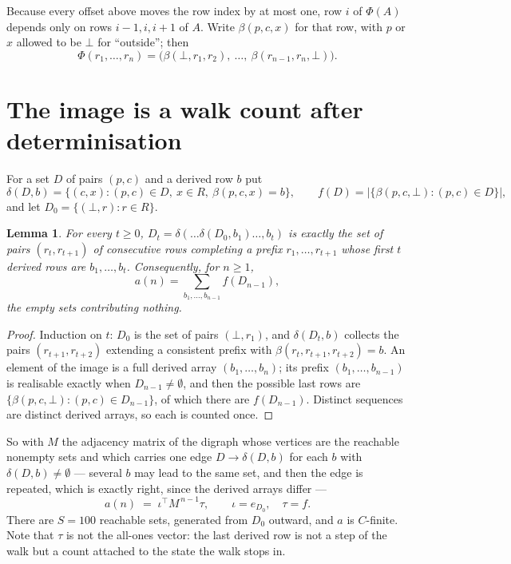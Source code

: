\documentclass[11pt,a4paper]{article}
\theoremstyle{plain}
\newtheorem{lemma}[theorem]{Lemma}
\theoremstyle{definition}
\begin{document}
Because every offset above moves the row index by at most one, row $i$ of
$\Phi(A)$ depends only on rows $i-1,i,i+1$ of $A$. Write $\beta(p,c,x)$ for that row, with $p$
or $x$ allowed to be $\bot$ for ``outside''; then
\[
\Phi(r_1,\dots,r_n)=\bigl(\beta(\bot,r_1,r_2),\ \dots,\ \beta(r_{n-1},r_n,\bot)\bigr).
\]

\section{The image is a walk count after determinisation}

For a set $D$ of pairs $(p,c)$ and a derived row $b$ put
\[
\delta(D,b)=\{(c,x):(p,c)\in D,\ x\in R,\ \beta(p,c,x)=b\},\qquad
f(D)=\bigl|\{\beta(p,c,\bot):(p,c)\in D\}\bigr| ,
\]
and let $D_0=\{(\bot,r):r\in R\}$.

\begin{lemma}\label{lem:det}
For every $t\ge0$, $D_t=\delta(\dots\delta(D_0,b_1)\dots,b_t)$ is exactly the set of pairs
$(r_t,r_{t+1})$ of consecutive rows completing a prefix $r_1,\dots,r_{t+1}$ whose first $t$
derived rows are $b_1,\dots,b_t$. Consequently, for $n\ge1$,
\[
a(n)=\sum_{b_1,\dots,b_{n-1}}f(D_{n-1}),
\]
the empty sets contributing nothing.
\end{lemma}

\begin{proof}
Induction on $t$: $D_0$ is the set of pairs $(\bot,r_1)$, and $\delta(D_t,b)$ collects the
pairs $(r_{t+1},r_{t+2})$ extending a consistent prefix with
$\beta(r_t,r_{t+1},r_{t+2})=b$. An element of the image is a full derived array
$(b_1,\dots,b_n)$; its prefix $(b_1,\dots,b_{n-1})$ is realisable exactly when
$D_{n-1}\neq\emptyset$, and then the possible last rows are
$\{\beta(p,c,\bot):(p,c)\in D_{n-1}\}$, of which there are $f(D_{n-1})$. Distinct sequences
are distinct derived arrays, so each is counted once.
\end{proof}

So with $M$ the adjacency matrix of the digraph whose vertices are the reachable nonempty sets
and which carries one edge $D\to\delta(D,b)$ for each $b$ with $\delta(D,b)\neq\emptyset$ ---
several $b$ may lead to the same set, and then the edge is repeated, which is exactly right,
since the derived arrays differ ---
\[
a(n)\;=\;\iota^{\!\top}M^{\,n-1}\tau,\qquad \iota=e_{D_0},\quad \tau=f .
\]
There are $S=100$ reachable sets, generated from $D_0$ outward, and $a$ is $C$-finite.
Note that $\tau$ is not the all-ones vector: the last derived row is not a
step of the walk but a count attached to the state the walk stops in.
\end{document}
